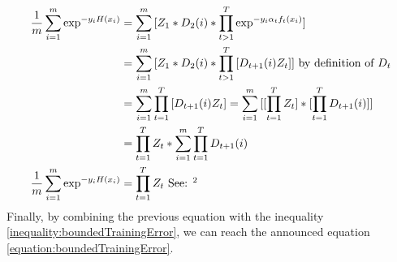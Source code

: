 \documentclass[12pt]{article}											%
\begin{document}
	\begin{equation*}
	\begin{aligned}
			\frac{1}{m} \sum_{i=1}^{m}{\exp^{-y_i H(x_i)}}	&= \sum_{i=1}^{m}{[Z_1 * D_2(i) * \prod_{t>1}^{T}{\exp^{-y_i \alpha_t f_t(x_i)} }]}\\
															&= \sum_{i=1}^{m}{[Z_1 * D_2(i) * \prod_{t>1}^{T}{[D_{t+1}(i)Z_t ]}]}  \mbox{   by definition of } D_{t}\\
                                                            &= \sum_{i=1}^{m}{\prod_{t=1}^{T}{[D_{t+1}(i)Z_t] }}
                                                            = \sum_{i=1}^{m}{[[\prod_{t=1}^{T}{Z_t }] * [\prod_{t=1}^{T}{D_{t+1}(i)}] ]}\\
                                                            &= \prod_{t=1}^{T}{Z_t } * \sum_{i=1}^{m}{\prod_{t=1}^{T}{D_{t+1}(i)} }\\
			\frac{1}{m} \sum_{i=1}^{m}{\exp^{-y_i H(x_i)}}	&= \prod_{t=1}^{T}{Z_t } \mbox{  See: \footnotemark[2]}
	\end{aligned}
	\end{equation*}
Finally, by combining the previous equation with the inequality \ref{inequality:boundedTrainingError}, we can reach the announced equation \ref{equation:boundedTrainingError}.






\end{document}
